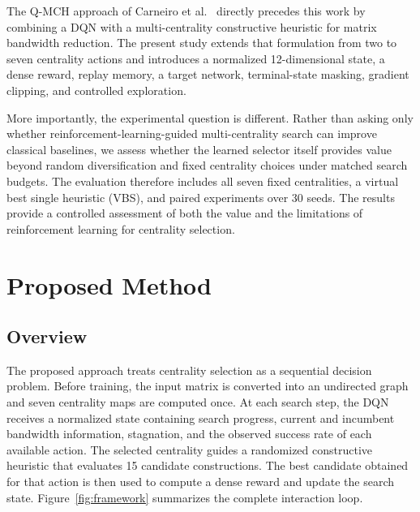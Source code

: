 \documentclass[runningheads]{llncs}
\begin{document}
The Q-MCH approach of Carneiro et al.~\cite{carneiro2024qmch} directly precedes this work by combining a DQN with a multi-centrality constructive heuristic for matrix bandwidth reduction. The present study extends that formulation from two to seven centrality actions and introduces a normalized 12-dimensional state, a dense reward, replay memory, a target network, terminal-state masking, gradient clipping, and controlled exploration.

More importantly, the experimental question is different. Rather than asking only whether reinforcement-learning-guided multi-centrality search can improve classical baselines, we assess whether the learned selector itself provides value beyond random diversification and fixed centrality choices under matched search budgets. The evaluation therefore includes all seven fixed centralities, a virtual best single heuristic (VBS), and paired experiments over 30 seeds. The results provide a controlled assessment of both the value and the limitations of reinforcement learning for centrality selection.

\section{Proposed Method}

\subsection{Overview}

The proposed approach treats centrality selection as a sequential decision problem. Before training, the input matrix is converted into an undirected graph and seven centrality maps are computed once. At each search step, the DQN receives a normalized state containing search progress, current and incumbent bandwidth information, stagnation, and the observed success rate of each available action. The selected centrality guides a randomized constructive heuristic that evaluates 15 candidate constructions. The best candidate obtained for that action is then used to compute a dense reward and update the search state. Figure~\ref{fig:framework} summarizes the complete interaction loop.
\end{document}
